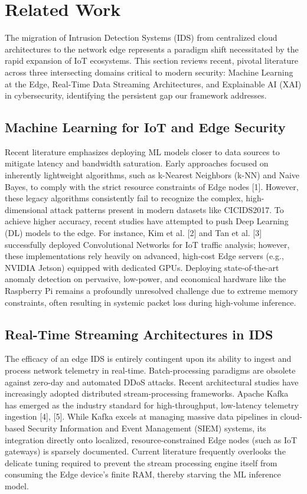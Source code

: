 \section{Related Work}
The migration of Intrusion Detection Systems (IDS) from centralized cloud architectures to the network edge represents a paradigm shift necessitated by the rapid expansion of IoT ecosystems. This section reviews recent, pivotal literature across three intersecting domains critical to modern security: Machine Learning at the Edge, Real-Time Data Streaming Architectures, and Explainable AI (XAI) in cybersecurity, identifying the persistent gap our framework addresses.

\subsection{Machine Learning for IoT and Edge Security}
Recent literature emphasizes deploying ML models closer to data sources to mitigate latency and bandwidth saturation. Early approaches focused on inherently lightweight algorithms, such as k-Nearest Neighbors (k-NN) and Naive Bayes, to comply with the strict resource constraints of Edge nodes [1]. However, these legacy algorithms consistently fail to recognize the complex, high-dimensional attack patterns present in modern datasets like CICIDS2017. To achieve higher accuracy, recent studies have attempted to push Deep Learning (DL) models to the edge. For instance, Kim et al. [2] and Tan et al. [3] successfully deployed Convolutional Networks for IoT traffic analysis; however, these implementations rely heavily on advanced, high-cost Edge servers (e.g., NVIDIA Jetson) equipped with dedicated GPUs. Deploying state-of-the-art anomaly detection on pervasive, low-power, and economical hardware like the Raspberry Pi remains a profoundly unresolved challenge due to extreme memory constraints, often resulting in systemic packet loss during high-volume inference.

\subsection{Real-Time Streaming Architectures in IDS}
The efficacy of an edge IDS is entirely contingent upon its ability to ingest and process network telemetry in real-time. Batch-processing paradigms are obsolete against zero-day and automated DDoS attacks. Recent architectural studies have increasingly adopted distributed stream-processing frameworks. Apache Kafka has emerged as the industry standard for high-throughput, low-latency telemetry ingestion [4], [5]. While Kafka excels at managing massive data pipelines in cloud-based Security Information and Event Management (SIEM) systems, its integration directly onto localized, resource-constrained Edge nodes (such as IoT gateways) is sparsely documented. Current literature frequently overlooks the delicate tuning required to prevent the stream processing engine itself from consuming the Edge device's finite RAM, thereby starving the ML inference model.

